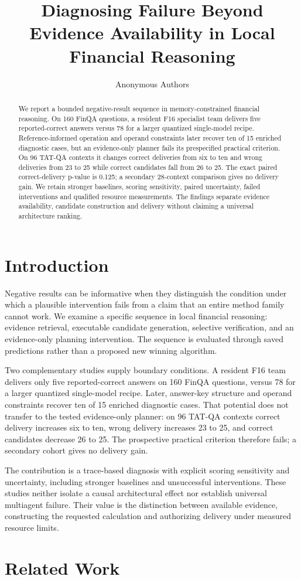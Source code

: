 \documentclass{article}
\title{Diagnosing Failure Beyond Evidence Availability in Local Financial Reasoning}
\author{Anonymous Authors}
\begin{document}
\maketitle
\begin{abstract}We report a bounded negative-result sequence in memory-constrained financial reasoning. On 160 FinQA questions, a resident F16 specialist team delivers five reported-correct answers versus 78 for a larger quantized single-model recipe. Reference-informed operation and operand constraints later recover ten of 15 enriched diagnostic cases, but an evidence-only planner fails its prespecified practical criterion. On 96 TAT-QA contexts it changes correct deliveries from six to ten and wrong deliveries from 23 to 25 while correct candidates fall from 26 to 25. The exact paired correct-delivery p-value is 0.125; a secondary 28-context comparison gives no delivery gain. We retain stronger baselines, scoring sensitivity, paired uncertainty, failed interventions and qualified resource measurements. The findings separate evidence availability, candidate construction and delivery without claiming a universal architecture ranking.\end{abstract}
\section{Introduction}
Negative results can be informative when they distinguish the condition under which a plausible intervention fails from a claim that an entire method family cannot work. We examine a specific sequence in local financial reasoning: evidence retrieval, executable candidate generation, selective verification, and an evidence-only planning intervention. The sequence is evaluated through saved predictions rather than a proposed new winning algorithm.

Two complementary studies supply boundary conditions. A resident F16 team delivers only five reported-correct answers on 160 FinQA questions, versus 78 for a larger quantized single-model recipe. Later, answer-key structure and operand constraints recover ten of 15 enriched diagnostic cases. That potential does not transfer to the tested evidence-only planner: on 96 TAT-QA contexts correct delivery increases six to ten, wrong delivery increases 23 to 25, and correct candidates decrease 26 to 25. The prospective practical criterion therefore fails; a secondary cohort gives no delivery gain.

The contribution is a trace-based diagnosis with explicit scoring sensitivity and uncertainty, including stronger baselines and unsuccessful interventions. These studies neither isolate a causal architectural effect nor establish universal multiagent failure. Their value is the distinction between available evidence, constructing the requested calculation and authorizing delivery under measured resource limits.\section{Related Work}
\end{document}
